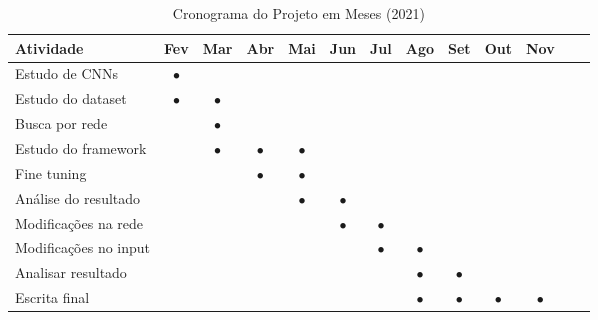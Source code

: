 \documentclass[
12pt,				    %
openright,			    %
oneside,			    %
a4paper,			    %
sumario=tradicional,    %
english,			    %
brazil,				    %
]{abntex2}              %
\begin{document}
	\begin{table}[htbp]
		\centering
		\caption{Cronograma do Projeto em Meses (2021)}
		\label{tab:cronograma}
		\begin{tabular}{lcccccccccccc} %
			\toprule
			\textbf{Atividade} & \textbf{Fev} & \textbf{Mar} & \textbf{Abr} & \textbf{Mai} & \textbf{Jun} & \textbf{Jul} & \textbf{Ago} & \textbf{Set} & \textbf{Out} & \textbf{Nov} \\
			\midrule
			Estudo de CNNs & $\bullet$\\
			Estudo do dataset & $\bullet$ & $\bullet$\\
			Busca por rede & & $\bullet$\\
			Estudo do framework & & $\bullet$ & $\bullet$ & $\bullet$\\
			Fine tuning & & & $\bullet$ & $\bullet$\\
			Análise do resultado & & & & $\bullet$ & $\bullet$\\
			Modificações na rede & & & & & $\bullet$ & $\bullet$\\
			Modificações no input & & & & & & $\bullet$ & $\bullet$\\
			Analisar resultado & & & & & & & $\bullet$ & $\bullet$\\
			Escrita final & & & & & & & $\bullet$ & $\bullet$ & $\bullet$ & $\bullet$\\
			\bottomrule
		\end{tabular}%
	\end{table}
		
	
	\postextual
	
	
	
	
	
\end{document}
